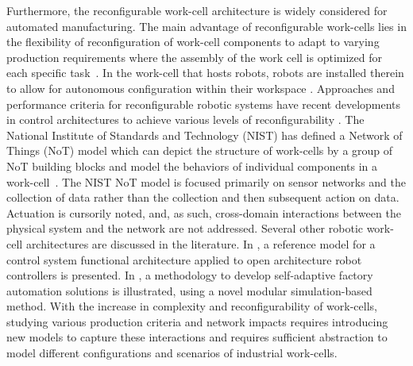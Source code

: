 Furthermore, the reconfigurable work-cell architecture is widely considered for automated manufacturing. The main advantage of reconfigurable work-cells lies in the flexibility of reconfiguration of work-cell components to adapt to varying production requirements where the assembly of the work cell is optimized for each specific task~\cite{CHEN2001199}. In the work-cell that hosts robots, robots are installed therein to allow for autonomous configuration within their workspace \cite{8023523,10.1007/978-3-319-65151-4_10,6059204}. Approaches and performance criteria for reconfigurable robotic systems have recent developments in control architectures to achieve various levels of reconfigurability \cite{Fulea}. The National Institute of Standards and Technology (NIST) has defined a Network of Things (NoT) model which can depict the structure of work-cells by a group of NoT building blocks and model the behaviors of individual components in a work-cell~\cite{NIST800-183}.  The NIST NoT model is focused primarily on sensor networks and the collection of data rather than the collection and then subsequent action on data.  Actuation is cursorily noted, and, as such, cross-domain interactions between the physical system and the network are not addressed. Several other robotic work-cell architectures are discussed in the literature. In \cite{OpenArch}, a reference model for a control system functional architecture applied to open architecture robot controllers is presented. In \cite{CARPANZANO2007435}, a methodology to develop self-adaptive factory automation solutions is illustrated, using a novel modular simulation-based method. With the increase in complexity and reconfigurability of work-cells, studying various production criteria and network impacts requires introducing new models to capture these interactions and requires sufficient abstraction to model different configurations and scenarios of industrial work-cells.  

